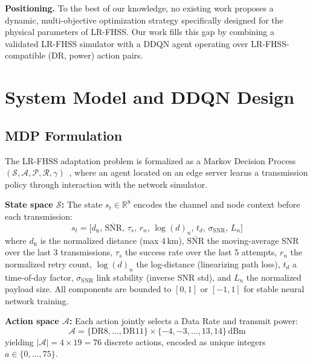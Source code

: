 \documentclass[conference]{IEEEtran}
\begin{document}
	\textbf{Positioning.}
	To the best of our knowledge, no existing work proposes a dynamic, multi-objective
	optimization strategy specifically designed for the physical parameters of LR-FHSS.
	Our work fills this gap by combining a validated LR-FHSS simulator with a DDQN
	agent operating over LR-FHSS-compatible (DR, power) action pairs.
	
	\section{System Model and DDQN Design}
	\label{sec:system}
	
	\subsection{MDP Formulation}
	
	The LR-FHSS adaptation problem is formalized as a Markov Decision Process
	$(\mathcal{S}, \mathcal{A}, \mathcal{P}, \mathcal{R}, \gamma)$~\cite{puterman1994mdp,sutton2018reinforcement},
	where an agent located on an edge server learns a transmission policy through
	interaction with the network simulator.
	
	\textbf{State space $\mathcal{S}$:}
	The state $s_t \in \mathbb{R}^8$ encodes the channel and node context before
	each transmission:
	\begin{equation}
		s_t = \bigl[d_{\text{n}},\, \overline{\text{SNR}},\, \tau_s,\, r_n,\,
		\log(d)_n,\, t_d,\, \sigma_{\text{SNR}},\, L_n\bigr]
	\end{equation}
	where $d_{\text{n}}$ is the normalized distance (max 4\,km),
	$\overline{\text{SNR}}$ the moving-average SNR over the last 3 transmissions,
	$\tau_s$ the success rate over the last 5 attempts, $r_n$ the normalized
	retry count, $\log(d)_n$ the log-distance (linearizing path loss),
	$t_d$ a time-of-day factor, $\sigma_{\text{SNR}}$ link stability (inverse
	SNR std), and $L_n$ the normalized payload size. All components are bounded
	to $[0,1]$ or $[-1,1]$ for stable neural network training.
	
	\textbf{Action space $\mathcal{A}$:}
	Each action jointly selects a Data Rate and transmit power:
	\begin{equation}
		\mathcal{A} = \{\text{DR8},\ldots,\text{DR11}\}
		\times \{-4, -3, \ldots, 13, 14\}\,\text{dBm}
	\end{equation}
	yielding $|\mathcal{A}| = 4 \times 19 = 76$ discrete actions, encoded as
	unique integers $a \in \{0,\ldots,75\}$.
	
\end{document}
